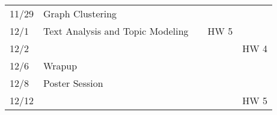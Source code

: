 \documentclass[11pt]{article}
\begin{document}
\begin{centering}
\begin{tabular}{||l|p{3in}|l|l|l||}
11/29 & Graph Clustering &  & & \\ 
12/1 & Text Analysis and Topic Modeling &&HW 5 &\\
12/2 &&&& HW 4\\
\hline 

12/6 & Wrapup & & & \\ 
12/8 & Poster Session &  &  &\\ 
\hline 
12/12 &&&& HW 5\\

\hline\hline


\end{tabular}\\
\end{centering}
\end{document}
